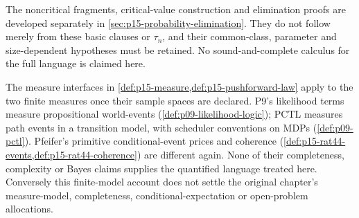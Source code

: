 The noncritical fragments, critical-value construction and elimination
proofs are developed separately in
\cref{sec:p15-probability-elimination}. They do not follow merely from
these basic clauses or \(\tau_n\), and their common-class, parameter
and size-dependent hypotheses must be retained.
No sound-and-complete calculus for the full language is claimed here.

The measure interfaces in \cref{def:p15-measure,def:p15-pushforward-law}
apply to the two finite measures once their sample spaces are declared.
P9's likelihood terms measure propositional world-events
(\cref{def:p09-likelihood-logic}); PCTL measures path events in a
transition model, with scheduler conventions on MDPs
(\cref{def:p09-pctl}). Pfeifer's primitive conditional-event prices and
coherence (\cref{def:p15-rat44-events,def:p15-rat44-coherence}) are different
again. None of their completeness, complexity or Bayes claims supplies
the quantified language treated here. Conversely this finite-model account
does not settle the original chapter's measure-model, completeness,
conditional-expectation or open-problem allocations.
